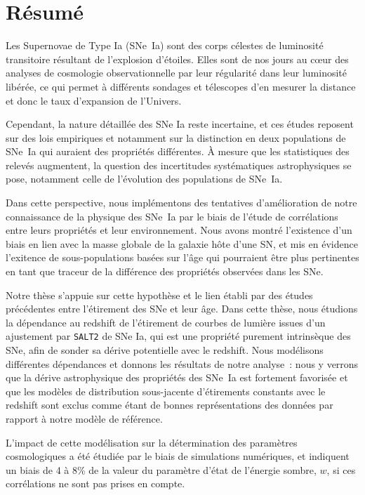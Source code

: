 \documentclass[../main/main.tex]{subfiles}
\begin{document}
\chapter*{Résumé}\label{ch:resume}

Les Supernovae de Type Ia (SNe~Ia) sont des corps célestes de luminosité
transitoire résultant de l'explosion d'étoiles. Elles sont de nos jours au cœur
des analyses de cosmologie observationnelle par leur régularité dans leur
luminosité libérée, ce qui permet à différents sondages et télescopes d'en
mesurer la distance et donc le taux d'expansion de l'Univers.

Cependant, la nature détaillée des SNe Ia reste incertaine, et ces études
reposent sur des lois empiriques et notamment sur la distinction en deux
populations de SNe~Ia qui auraient des propriétés différentes. À mesure que les
statistiques des relevés augmentent, la question des incertitudes systématiques
astrophysiques se pose, notamment celle de l'évolution des populations de
SNe~Ia.

Dans cette perspective, nous implémentons des tentatives d'amélioration de notre
connaissance de la physique des SNe~Ia par le biais de l'étude de corrélations
entre leurs propriétés et leur environnement. Nous avons montré l'existence d'un
biais en lien avec la masse globale de la galaxie hôte d'une SN, et mis en
évidence l'exitence de sous-populations basées sur l'âge qui pourraient être
plus pertinentes en tant que traceur de la différence des propriétés observées
dans les SNe.

Notre thèse s'appuie sur cette hypothèse et le lien établi par des études
précédentes entre l'étirement des SNe et leur âge. Dans cette thèse, nous
étudions la dépendance au redshift de l'étirement de courbes de lumière issues
d'un ajustement par \texttt{SALT2} de SNe Ia, qui est une propriété purement
intrinsèque des SNe, afin de sonder sa dérive potentielle avec le redshift. Nous
modélisons différentes dépendances et donnons les résultats de notre analyse~:
nous y verrons que la dérive astrophysique des propriétés des SNe~Ia est
fortement favorisée et que les modèles de distribution sous-jacente d'étirements
constants avec le redshift sont exclus comme étant de bonnes représentations des
données par rapport à notre modèle de référence.

L'impact de cette modélisation sur la détermination des paramètres cosmologiques
a été étudiée par le biais de simulations numériques, et indiquent un biais
de 4 à 8\% de la valeur du paramètre d'état de l'énergie sombre, $w$, si ces
corrélations ne sont pas prises en compte.
\end{document}
